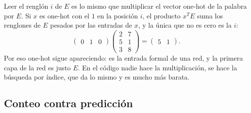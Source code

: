 \documentclass[11pt,letterpaper]{article}
\begin{document}
\begin{idea}
    Leer el renglón $i$ de $E$ es lo mismo que multiplicar el vector
    one-hot de la palabra por $E$. Si $x$ es one-hot con el $1$ en la
    posición $i$, el producto $x^{T} E$ suma los renglones de $E$
    pesados por las entradas de $x$, y la única que no es cero es la
    $i$:
    \[
        \begin{pmatrix} 0 & 1 & 0 \end{pmatrix}
        \begin{pmatrix} 2 & 7 \\ 5 & 1 \\ 3 & 8 \end{pmatrix}
        = \begin{pmatrix} 5 & 1 \end{pmatrix} .
    \]
    Por eso one-hot sigue apareciendo: es la entrada formal de una red,
    y la primera capa de la red es justo $E$. En el código nadie hace
    la multiplicación, se hace la búsqueda por índice, que da lo mismo
    y es mucho más barata.
\end{idea}


\subsection*{Conteo contra predicción}

\begin{center}
\end{center}
\end{document}
